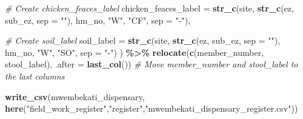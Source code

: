 \documentclass[
]{article}
\newenvironment{Shaded}{\begin{snugshade}}{\end{snugshade}}
\newcommand{\AttributeTok}[1]{\textcolor[rgb]{0.13,0.29,0.53}{#1}}
\newcommand{\CommentTok}[1]{\textcolor[rgb]{0.56,0.35,0.01}{\textit{#1}}}
\newcommand{\FunctionTok}[1]{\textcolor[rgb]{0.13,0.29,0.53}{\textbf{#1}}}
\newcommand{\NormalTok}[1]{#1}
\newcommand{\SpecialCharTok}[1]{\textcolor[rgb]{0.81,0.36,0.00}{\textbf{#1}}}
\newcommand{\StringTok}[1]{\textcolor[rgb]{0.31,0.60,0.02}{#1}}
\begin{document}
\begin{Shaded}
\begin{Highlighting}[]
    \CommentTok{\# Create chicken\_feaces\_label}
    \AttributeTok{chicken\_feaces\_label =} \FunctionTok{str\_c}\NormalTok{(site, }\FunctionTok{str\_c}\NormalTok{(ez, sub\_ez, }\AttributeTok{sep =} \StringTok{""}\NormalTok{), hm\_no, }\StringTok{"W"}\NormalTok{, }\StringTok{"CF"}\NormalTok{, }\AttributeTok{sep =} \StringTok{"{-}"}\NormalTok{),}
    
    \CommentTok{\# Create soil\_label}
    \AttributeTok{soil\_label =} \FunctionTok{str\_c}\NormalTok{(site, }\FunctionTok{str\_c}\NormalTok{(ez, sub\_ez, }\AttributeTok{sep =} \StringTok{""}\NormalTok{), hm\_no, }\StringTok{"W"}\NormalTok{, }\StringTok{"SO"}\NormalTok{, }\AttributeTok{sep =} \StringTok{"{-}"}\NormalTok{)}
\NormalTok{  ) }\SpecialCharTok{\%\textgreater{}\%}
  \FunctionTok{relocate}\NormalTok{(}\FunctionTok{c}\NormalTok{(member\_number, stool\_label), }\AttributeTok{.after =} \FunctionTok{last\_col}\NormalTok{())  }\CommentTok{\# Move member\_number and stool\_label to the last columns}

\FunctionTok{write\_csv}\NormalTok{(mwembekati\_dispensary, }\FunctionTok{here}\NormalTok{(}\StringTok{"field\_work\_register"}\NormalTok{,}\StringTok{"register"}\NormalTok{,}\StringTok{"mwembekati\_dispensary\_register.csv"}\NormalTok{))}
\end{Highlighting}
\end{Shaded}
\end{document}
